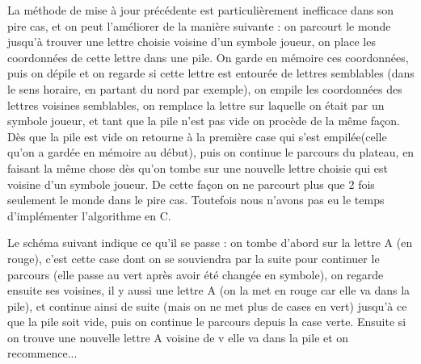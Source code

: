 \documentclass[a4paper,11pt]{article}
\begin{document}
La méthode de mise à jour précédente est particulièrement inefficace dans son
pire cas, et on peut l'améliorer de la manière suivante : on parcourt le monde
jusqu'à trouver une lettre choisie voisine d'un symbole joueur, on place les coordonnées de
cette lettre dans une pile. On garde en mémoire ces coordonnées, puis on dépile et
on regarde si cette lettre est entourée de lettres semblables (dans le sens horaire, 
en partant du nord par exemple), on empile les coordonnées des lettres voisines semblables,
on remplace la lettre sur laquelle on était par un symbole joueur,
et tant que la pile n'est pas vide on procède de la même façon. Dès que la pile est vide
on retourne à la première case qui s'est empilée(celle qu'on a gardée en mémoire au début), puis on continue le parcours 
du plateau, en faisant la même chose dès qu'on tombe sur une nouvelle lettre choisie
qui est voisine d'un symbole joueur. De cette façon on ne parcourt plus que 2 fois
seulement le monde dans le pire cas. Toutefois nous n'avons pas eu le temps
d'implémenter l'algorithme en C.

Le schéma suivant indique ce qu'il se passe :
on tombe d'abord sur la lettre A (en rouge), c'est cette case dont on
se souviendra par la suite pour continuer le parcours (elle passe au vert
après avoir été changée en symbole), on regarde ensuite ses voisines, il y aussi
une lettre A (on la met en rouge car elle va dans la pile), et continue ainsi de 
suite (mais on ne met plus de cases en vert) jusqu'à ce que la pile soit vide, puis
on continue le parcours depuis la case verte. Ensuite si on trouve une nouvelle
lettre A voisine de v elle va dans la pile et on recommence...
\end{document}
